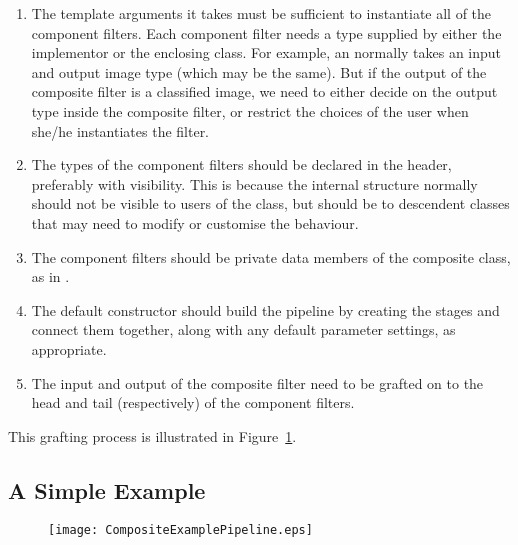 \begin{enumerate}

\item The template arguments it takes must be sufficient to instantiate all of
the component filters.  Each component filter needs a type supplied by either
the implementor or the enclosing class.  For example, an
 normally takes an input and output image type (which
may be the same).  But if the output of the composite filter is a classified
image, we need to either decide on the output type inside the composite filter,
or restrict the choices of the user when she/he instantiates the filter.

\item The types of the component filters should be declared in the header,
  preferably with  visibility.  This is because the
  internal structure normally should not be visible to users of the class,
  but should be to descendent classes that may need to modify or customise
  the behaviour. 

\item The component filters should be private data members of the composite
  class, as in . 

\item The default constructor should build the pipeline by creating the
  stages and connect them together, along with any default parameter
  settings, as appropriate. 

\item The input and output of the composite filter need to be grafted on to
  the head and tail (respectively) of the component filters. 

\end{enumerate}

This grafting process is illustrated in Figure~\ref{fig:CompositeExamplePipeline}. 


\subsection{A Simple Example}

\begin{figure}
  \centering
  \texttt{[image: CompositeExamplePipeline.eps]}
  \label{fig:CompositeExamplePipeline}
\end{figure}



